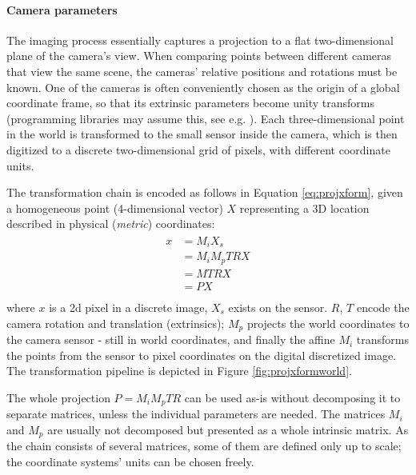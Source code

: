 
\paragraph{Camera parameters}
The imaging process essentially captures a projection to a flat two-dimensional plane of the camera's view.
When comparing points between different cameras that view the same scene, the cameras' relative positions and rotations must be known.
One of the cameras is often conveniently chosen as the origin of a global coordinate frame, so that its extrinsic parameters become unity transforms (programming libraries may assume this, see e.g. \cite{opencv}).
Each three-dimensional point in the world is transformed to the small sensor inside the camera, which is then digitized to a discrete two-dimensional grid of pixels, with different coordinate units.

The transformation chain is encoded as follows in Equation \ref{eq:projxform}, given a homogeneous point (4-dimensional vector) $X$ representing a 3D location described in physical (\emph{metric}) coordinates:
\begin{align} \label{eq:projxform} \begin{split}
	x
	&= M_i X_s\\
	&= M_i M_p T R X\\
	&= M T R X\\
	&= P X\\
\end{split} \end{align}
where $x$ is a 2d pixel in a discrete image, $X_s$ exists on the sensor.
$R$, $T$ encode the camera rotation and translation (extrinsics);
$M_p$ projects the world coordinates to the camera sensor - still in world coordinates, and finally the affine $M_i$ transforms the points from the sensor to pixel coordinates on the digital discretized image.
The transformation pipeline is depicted in Figure \ref{fig:projxformworld}.



The whole projection $P = M_i M_p T R$ can be used as-is without decomposing it to separate matrices, unless the individual parameters are needed.
The matrices $M_i$ and $M_p$ are usually not decomposed but presented as a whole intrinsic matrix.
As the chain consists of several matrices, some of them are defined only up to scale; the coordinate systems' units can be chosen freely.

